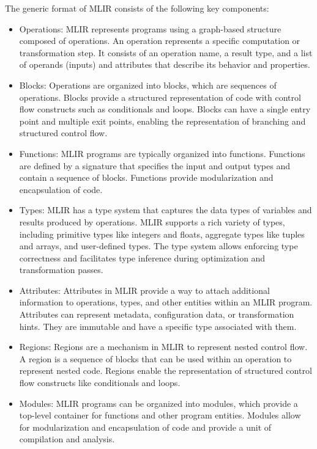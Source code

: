 The generic format of MLIR consists of the following key components:
\begin{itemize}
    \item Operations: MLIR represents programs using a graph-based structure composed of operations. An operation represents a specific computation or transformation step. It consists of an operation name, a result type, and a list of operands (inputs) and attributes that describe its behavior and properties.

    \item Blocks: Operations are organized into blocks, which are sequences of operations. Blocks provide a structured representation of code with control flow constructs such as conditionals and loops. Blocks can have a single entry point and multiple exit points, enabling the representation of branching and structured control flow.

    \item Functions: MLIR programs are typically organized into functions. Functions are defined by a signature that specifies the input and output types and contain a sequence of blocks. Functions provide modularization and encapsulation of code.

    \item Types: MLIR has a type system that captures the data types of variables and results produced by operations. MLIR supports a rich variety of types, including primitive types like integers and floats, aggregate types like tuples and arrays, and user-defined types. The type system allows enforcing type correctness and facilitates type inference during optimization and transformation passes.

    \item Attributes: Attributes in MLIR provide a way to attach additional information to operations, types, and other entities within an MLIR program. Attributes can represent metadata, configuration data, or transformation hints. They are immutable and have a specific type associated with them.

    \item Regions: Regions are a mechanism in MLIR to represent nested control flow. A region is a sequence of blocks that can be used within an operation to represent nested code. Regions enable the representation of structured control flow constructs like conditionals and loops.

    \item Modules: MLIR programs can be organized into modules, which provide a top-level container for functions and other program entities. Modules allow for modularization and encapsulation of code and provide a unit of compilation and analysis.

\end{itemize}

